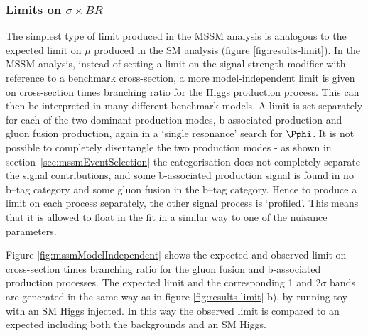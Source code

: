 \subsubsection{Limits on $\sigma \times BR$}

The simplest type of limit produced in the \ac{MSSM} analysis is analogous to the 
expected limit on $\mu$ produced in the \ac{SM} analysis (figure
\ref{fig:results-limit}). In the \ac{MSSM} analysis, instead of setting a limit
on the signal strength modifier with reference to a benchmark cross-section, a
more model-independent limit is given on cross-section times branching ratio
for the Higgs production process. This can then be interpreted in many different
benchmark models. A limit is set separately for each of the two dominant production modes,
b-associated production and gluon fusion production, again in a `single
resonance' search for $\Pphi$. It is not possible to
completely disentangle the two production modes - as shown in
section~\ref{sec:mssmEventSelection} the categorisation does not completely
separate the signal contributions, and some b-associated production signal is
found in no b--tag category and some gluon fusion in the b--tag category. Hence
to produce a limit on each process separately, the other signal process is
`profiled'. This means that it is allowed to float in the fit in a similar way
to one of the nuisance parameters. 

Figure \ref{fig:mssmModelIndependent} shows the expected and observed limit on
cross-section times branching ratio for the gluon fusion and b-associated
production processes. The expected limit and the corresponding 1 and 2$\sigma$ bands
are generated in the same way as in figure \ref{fig:results-limit} b), by
running toy with an \ac{SM} Higgs injected.
In this way the observed limit is compared to an expected including both the
backgrounds and an \ac{SM} Higgs. 


